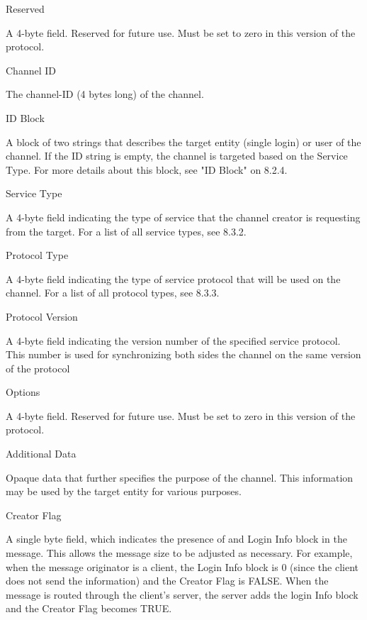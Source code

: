 \documentclass[titlepage,oneside]{book}
\begin{document}
\par{} Reserved

\subpar{}  A 4-byte field. Reserved for future use. Must be set to zero in this
  version of the protocol.

\par{} Channel ID

\subpar{}  The channel-ID (4 bytes long) of the channel.

\par{} ID Block

\subpar{}  A block of two strings that describes the target entity (single
  login) or user of the channel. If the ID string is empty, the channel
  is targeted based on the Service Type. For more details about this
  block, see "ID Block" on 8.2.4.

\par{} Service Type

\subpar{}  A 4-byte field indicating the type of service that the channel
  creator is requesting from the target. For a list of all service
  types, see 8.3.2.

\par{} Protocol Type

\subpar{}  A 4-byte field indicating the type of service protocol that will be 
  used on the channel. For a list of all protocol types, see 
  8.3.3.

\par{} Protocol Version

\subpar{} A 4-byte field indicating the version number of the specified service
  protocol. This number is used for synchronizing both sides the
  channel on the same version of the protocol

\par{} Options

\subpar{}  A 4-byte field. Reserved for future use. Must be set to zero in this
  version of the protocol.

\par{} Additional Data

\subpar{}  Opaque data that further specifies the purpose of the channel. This
  information may be used by the target entity for various purposes.

\par{} Creator Flag

\subpar{}  A single byte field, which indicates the presence of and Login Info
  block in the message. This allows the message size to be adjusted as
  necessary. For example, when the message originator is a client, the
  Login Info block is 0 (since the client does not send the
  information) and the Creator Flag is FALSE. When the message is
  routed through the client's server, the server adds the login Info
  block and the Creator Flag becomes TRUE.
\end{document}
